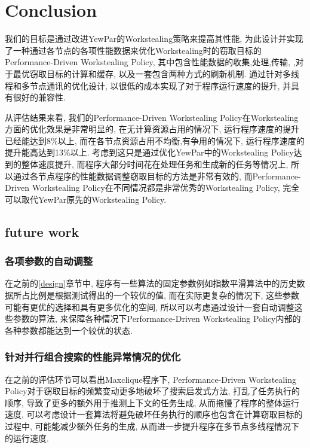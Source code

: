 \documentclass{mproj}
\begin{document}
\chapter{Conclusion}\label{conclusion}

我们的目标是通过改进YewPar的Workstealing策略来提高其性能,
为此设计并实现了一种通过各节点的各项性能数据来优化Workstealing时的窃取目标的Performance-Driven Workstealing Policy,
其中包含性能数据的收集,处理,传输,
,对于最优窃取目标的计算和缓存,
以及一套包含两种方式的刷新机制.
通过针对多线程和多节点通讯的优化设计,
以很低的成本实现了对于程序运行速度的提升,
并具有很好的兼容性.

从评估结果来看,
我们的Performance-Driven Workstealing Policy在Workstealing方面的优化效果是非常明显的,
在无计算资源占用的情况下,
运行程序速度的提升已经能达到8\%以上,
而在各节点资源占用不均衡,有争用的情况下,
运行程序速度的提升能高达到13\%以上.
考虑到这只是通过优化YewPar中的Workstealing Policy达到的整体速度提升,
而程序大部分时间花在处理任务和生成新的任务等情况上,
所以通过各节点程序的性能数据调整窃取目标的方法是非常有效的,
而Performance-Driven Workstealing Policy在不同情况都是非常优秀的Workstealing Policy,
完全可以取代YewPar原先的Workstealing Policy.

\section{future work}

\subsection{各项参数的自动调整}

在之前的\ref{design}章节中,
程序有一些算法的固定参数例如指数平滑算法中的历史数据所占比例是根据测试得出的一个较优的值,
而在实际更复杂的情况下,
这些参数可能有更优的选择和具有更多优化的空间,
所以可以考虑通过设计一套自动调整这些参数的算法,
来保障各种情况下Performance-Driven Workstealing Policy内部的各种参数都能达到一个较优的状态.

\subsection{针对并行组合搜索的性能异常情况的优化}

在之前的评估环节可以看出Maxclique程序下,
Performance-Driven Workstealing Policy对于窃取目标的频繁变动更多地破坏了搜索启发式方法,
打乱了任务执行的顺序,
导致了更多的额外用于推测上下文的任务生成,
从而拖慢了程序的整体运行速度,
可以考虑设计一套算法将避免破坏任务执行的顺序也包含在计算窃取目标的过程中,
可能能减少额外任务的生成,
从而进一步提升程序在多节点多线程情况下的运行速度.
\end{document}
